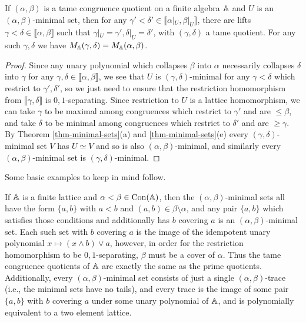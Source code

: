 \begin{appendices}
\begin{prop} If $(\alpha,\beta)$ is a tame congruence quotient on a finite algebra $\mathbb{A}$ and $U$ is an $(\alpha,\beta)$-minimal set, then for any $\gamma' < \delta' \in \llbracket \alpha|_U ,\beta|_U \rrbracket$, there are lifts $\gamma < \delta \in \llbracket \alpha, \beta \rrbracket$ such that $\gamma|_U = \gamma', \delta|_U = \delta'$, with $(\gamma,\delta)$ a tame quotient. For any such $\gamma, \delta$ we have $M_{\mathbb{A}}(\gamma,\delta) = M_{\mathbb{A}}(\alpha,\beta)$.
\end{prop}
\begin{proof} Since any unary polynomial which collapses $\beta$ into $\alpha$ necessarily collapses $\delta$ into $\gamma$ for any $\gamma,\delta \in \llbracket \alpha, \beta \rrbracket$, we see that $U$ is $(\gamma,\delta)$-minimal for any $\gamma < \delta$ which restrict to $\gamma', \delta'$, so we just need to ensure that the restriction homomorphism from $\llbracket \gamma, \delta \rrbracket$ is $0,1$-separating. Since restriction to $U$ is a lattice homomorphism, we can take $\gamma$ to be maximal among congruences which restrict to $\gamma'$ and are $\le \beta$, and take $\delta$ to be minimal among congruences which restrict to $\delta'$ and are $\ge \gamma$. By Theorem \ref{thm-minimal-sets}(a) and \ref{thm-minimal-sets}(e) every $(\gamma,\delta)$-minimal set $V$ has $U \simeq V$ and so is also $(\alpha,\beta)$-minimal, and similarly every $(\alpha,\beta)$-minimal set is $(\gamma,\delta)$-minimal.
\end{proof}

Some basic examples to keep in mind follow.

\begin{ex} If $\mathbb{A}$ is a finite lattice and $\alpha < \beta \in \operatorname{Con}(\mathbb{A})$, then the $(\alpha,\beta)$-minimal sets all have the form $\{a,b\}$ with $a < b$ and $(a,b) \in \beta\setminus \alpha$, and any pair $\{a,b\}$ which satisfies those conditions and additionally has $b$ covering $a$ is an $(\alpha,\beta)$-minimal set. Each such set with $b$ covering $a$ is the image of the idempotent unary polynomial $x \mapsto (x \wedge b) \vee a$, however, in order for the restriction homomorphism to be $0,1$-separating, $\beta$ must be a cover of $\alpha$. Thus the tame congruence quotients of $\mathbb{A}$ are exactly the same as the prime quotients. Additionally, every $(\alpha,\beta)$-minimal set consists of just a single $(\alpha,\beta)$-trace (i.e., the minimal sets have no tails), and every trace is the image of some pair $\{a,b\}$ with $b$ covering $a$ under some unary polynomial of $\mathbb{A}$, and is polynomially equivalent to a two element lattice.
\end{ex}


\end{appendices}
